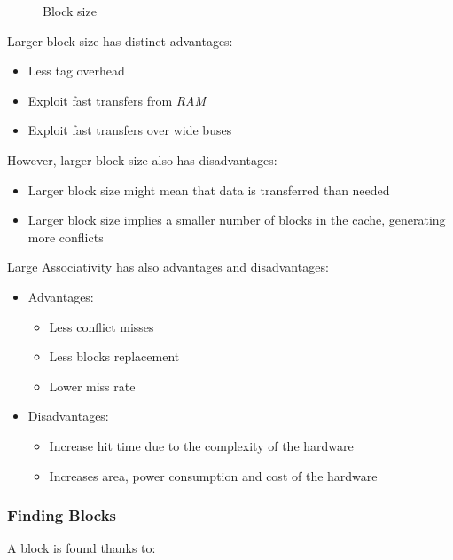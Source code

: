 \documentclass[english]{article}
\begin{document}
\begin{figure}
  \bigskip
  \centering
  \caption{Block size}
  \label{fig:block-size}
  \bigskip
\end{figure}

Larger block size has distinct advantages:

\begin{itemize}
  \item Less tag overhead
  \item Exploit fast transfers from \textit{RAM}
  \item Exploit fast transfers over wide buses
\end{itemize}

However, larger block size also has disadvantages:

\begin{itemize}
  \item Larger block size might mean that data is transferred than needed
  \item Larger block size implies a smaller number of blocks in the cache, generating more conflicts
\end{itemize}

Large Associativity has also advantages and disadvantages:

\begin{itemize}
  \item Advantages:
        \begin{itemize}
          \item Less conflict misses
          \item Less blocks replacement
          \item Lower miss rate
        \end{itemize}
  \item Disadvantages:
        \begin{itemize}
          \item Increase hit time due to the complexity of the hardware
          \item Increases area, power consumption and cost of the hardware
        \end{itemize}
\end{itemize}

\subsubsection{Finding Blocks}

A block is found thanks to:
\end{document}
